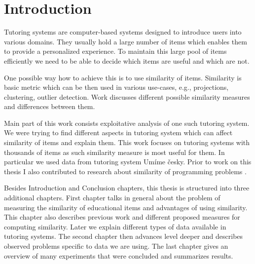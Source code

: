 \documentclass[
  digital, %
  table,   %
  nolof,     %
  nolot,     %
  nocover,
  color,
  final, %
]{fithesis3}
\begin{document}
\newcommand{\ppl}[1]{\textcolor[rgb]{0.6,0.2,1.0}{#1}}
\newcommand{\umimeCesky}{Umíme česky}



\chapter*{Introduction}



Tutoring systems are computer-based systems designed to introduce users into various domains. They usually hold a large number of items which enables them to provide a personalized experience. To maintain this large pool of items efficiently we need to be able to decide which items are useful and which are not.


One possible way how to achieve this is to use similarity of items. Similarity is basic metric which can be then used in various use-cases, e.g., projections, clustering, outlier detection. Work discusses different possible similarity measures and differences between them.


Main part of this work consists exploitative analysis of one such tutoring system. We were trying to find different aspects in tutoring system which can affect similarity of items and explain them. This work focuses on tutoring systems with thousands of items as such similarity measure is most useful for them. In particular we used data from tutoring system \umimeCesky{}. Prior to work on this thesis I also contributed to research about similarity of programming problems \cite{pelanek2018programming}.


Besides Introduction and Conclusion chapters, this thesis is structured into three additional chapters. First chapter talks in general about the problem of measuring the similarity of educational items and advantages of using similarity. This chapter also describes previous work and different proposed measures for computing similarity. Later we explain different types of data available in tutoring systems. The second chapter then advances level deeper and describes observed problems specific to data we are using.
The last chapter gives an overview of many experiments that were concluded and summarizes results.
\end{document}
